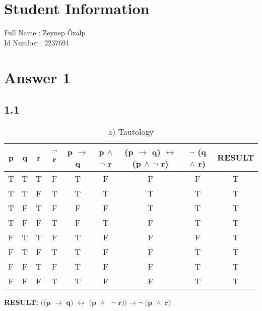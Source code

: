 \documentclass[12pt]{article}
\begin{document}
\section*{Student Information } 
Full Name : Zeynep Özalp \\
Id Number : 2237691 \\

\section*{Answer 1}
\subsection*{1.1}

\begin{table}[H]
\small
\centering
\caption{ a) Tautology }
\label{table:example}
\begin{tabular}
{|c|c|c|c|c|c|c|c|c|}	%
\hline 							%
\textbf{p} & \textbf{q} & \textbf{r} & \textbf{$\neg$ r} & \textbf{p $\rightarrow$ q} & \textbf{p $\wedge$ $\neg$ r} & \textbf{(p $\rightarrow$ q) $\leftrightarrow$ (p $\wedge$ $\neg$ r)} & \textbf{$\neg$ (q $\wedge$ r)}  & \textbf{RESULT}\\
\hline 
T & T & T & F & T & F & F & F & T \\			%
T & T & F & T & T & T & T & T & T \\
T & F & T & F & F & F & T & T & T \\
T & F & F & T & F & T & F & T & T \\
F & T & T & F & T & F & F & F & T \\
F & T & F & T & T & F & F & T & T \\
F & F & T & F & T & F & F & T & T \\
F & F & F & T & T & F & F & T & T \\

\hline 

\end{tabular}
\end{table}
\quad \textbf{RESULT:} $\textbf{((p $\rightarrow$ q) $\leftrightarrow$ (p $\wedge$ $\neg$ r))} \rightarrow \textbf{$\neg$ (p $\wedge$ r)}$
\end{document}
